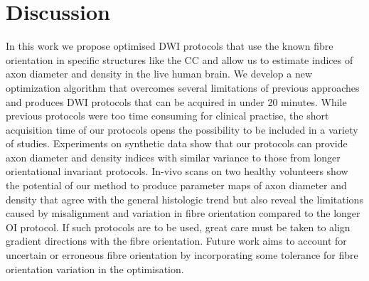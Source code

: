 \section{Discussion}
In this work we propose optimised {\gls{DWI}} protocols that use the known fibre orientation in specific structures like the \gls{CC} and allow us to estimate indices of axon diameter and density in the live human brain. We develop a new optimization algorithm that overcomes several limitations of previous approaches and produces DWI protocols that can be acquired in under 20 minutes. While previous protocols were too time consuming for clinical practise, the short acquisition time of our protocols opens the possibility to be included in a variety of studies. Experiments on synthetic data show that our protocols can provide axon diameter and density indices with similar variance to those from longer orientational invariant protocols. In-vivo scans on two healthy volunteers show the potential of our method to produce parameter maps of axon diameter and density that agree with the general histologic trend but also reveal the limitations caused by misalignment and variation in fibre orientation compared to the longer OI protocol. If such protocols are to be used, great care must be taken to align gradient directions with the fibre orientation. Future work aims to account for uncertain or erroneous fibre orientation by incorporating some tolerance for fibre orientation variation in the optimisation.
